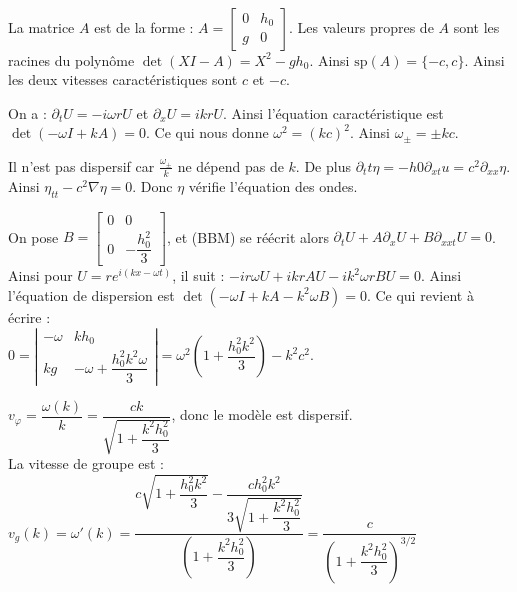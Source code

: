 \documentclass[12pt,a4paper]{article}
\begin{document}
	\begin{sol}
		$ $\\
		 \begin{enumerate}
		 	\begin{minipage}{17cm}
		 		\item La matrice $A$ est de la forme : $A = \begin{bmatrix}
		 			0 & h_0\\
		 			g & 0
		 		\end{bmatrix}$. Les valeurs propres de $A$ sont les racines du polynôme $\det(XI-A) = X^2-gh_0$. Ainsi $\mathrm{sp}(A) = \{-c,c\}$.  Ainsi les deux vitesses caractéristiques sont $c$ et $-c$.
		 		
		 		\item On a : $\partial_t U = -i\omega r U$ et $\partial_x U = ikr U$. Ainsi l'équation caractéristique est $\det(-\omega I + kA) = 0$. Ce qui nous donne $\omega^2 = (kc)^2$. Ainsi $\omega_\pm = \pm kc$.
		 		
		 		\item Il n'est pas dispersif car $\frac{\omega_\pm}k$ ne dépend pas de $k$. De plus $\partial_tt \eta = -h0\partial_{xt} u = c^2 \partial_{xx} \eta$.
		 		Ainsi $\eta_{tt} - c^2 \nabla \eta = 0$. Donc $\eta$ vérifie l'équation des ondes.
		 		
		 		\item On pose $B = \begin{bmatrix}
		 			0 & 0\\
		 			0 & -\dfrac{h_0^2}3
		 		\end{bmatrix}$, et (BBM) se réécrit alors $\partial_t U + A\partial_x U+B\partial_{xxt} U = 0$. Ainsi pour $U = re^{i(kx-\omega t)}$, il suit : $-ir\omega U + ikr AU-ik^2 \omega r BU = 0$. Ainsi l'équation de dispersion est $\det(-\omega I + kA-k^2\omega B) = 0$. Ce qui revient à écrire :\\ $0 = \left|\begin{matrix}
		 		-\omega & kh_0\\
		 		kg & -\omega+\dfrac{h_0^2k^2\omega}3
		 		\end{matrix}\right| =\omega^2\left(1+\dfrac{h_0^2k^2}3\right) - k^2c^2$.
		 		
		 		\vspace{.5cm}
		 		
		 		\item $v_\varphi = \dfrac{\omega(k)}k = \dfrac{ck}{\sqrt{1+\dfrac{k^2h_0^2}3}} $, donc le modèle est dispersif.\\
		 		La vitesse de groupe est : $v_g(k) = \omega'(k) = \dfrac{c\sqrt{1+\dfrac{h_0^2k^2}3} -\dfrac{ch_0^2k^2}{3\sqrt{1+\dfrac{k^2h_0^2}3}}}{\left(1+\dfrac{k^2h_0^2}3\right)} = \dfrac{c}{\left(1+\dfrac{k^2h_0^2}3\right)^{3/2}}$
		 	\end{minipage}
		 \end{enumerate}
	\end{sol}
\end{document}
